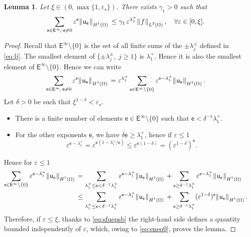 \documentclass[10pt,a4paper]{amsart}
\newtheorem{lemma}{Lemma}
\newcommand {\DNorm}[2]{ \mathchoice
    {\|\ee #1\ee\|\dd{#2}\,}
    {\| #1 \|_{#2}}
    {\| #1 \|_{#2}}
    {\| #1 \|_{#2}} }
\newcommand{\dd}[1]{_{\raise-0.6ex\hbox{$\scriptstyle #1$}}}
\newcommand{\ee}{\hskip0.15ex}
\newcommand{\sfE}{{\mathsf E}}
\newcommand{\sfe}{{\mathsf e}}
\newcommand{\sfu}{{\mathsf u}}
\begin{document}
\begin{lemma}
\label{lem:S1}
Let $\xi\in(0,\max\{1,\varepsilon_\star\})$. There exists $\gamma_1>0$ such that
\[
   \sum_{\sfe\in\sfE^\infty\!,\;\sfe\neq0} \varepsilon^{\sfe} \DNorm{\sfu_\sfe}{H^1(\Omega)}
   \le \gamma_1\, \varepsilon^{\lambda^+_1}
   {\DNorm{f}{L^2(\Omega)}},\quad\forall\varepsilon\in[0,\xi].
\]
\end{lemma}

\begin{proof}
Recall that $\sfE^\infty\setminus\{0\}$ is the set of all finite sums of the $\pm\lambda^\pm_j$ defined in \eqref{eq:lj}. The smallest element of $\{\pm\lambda^\pm_j,\;j\ge1\}$ is $\lambda^+_1$. Hence it is also the smallest element of $\sfE^\infty\setminus\{0\}$. Hence we can write
\begin{equation}
\label{eq:eneq0}
   \sum_{\sfe\in\sfE^\infty\!,\;\sfe\neq0} \varepsilon^{\sfe} \DNorm{\sfu_\sfe}{H^1(\Omega)} =
   \varepsilon^{\lambda^+_1} 
   \sum_{\sfe\in\sfE^\infty\setminus\{0\}} \varepsilon^{\sfe-\lambda^+_1} 
   \DNorm{\sfu_\sfe}{H^1(\Omega)}.
\end{equation}
Let $\delta>0$ be such that $\xi^{1-\delta}<\varepsilon_\star$. 
\begin{itemize}
\item There is a finite number of elements $\sfe\in\sfE^\infty\setminus\{0\}$ such that $\sfe<\delta^{-1}\lambda^+_1$.

\item For the other exponents $\sfe$, we have $\delta\sfe\ge \lambda^+_1$, hence if $\varepsilon\le1$
\[
   \varepsilon^{\sfe-\lambda^+_1} = 
   \varepsilon^{\sfe(1-\lambda^+_1/\sfe)} \le 
   \varepsilon^{\sfe(1-\delta)}=
   (\varepsilon^{1-\delta})^\sfe.
\]
\end{itemize}
Hence for $\varepsilon\le1$
\[
\begin{aligned}
   \sum_{\sfe\in\sfE^\infty\setminus\{0\}} \varepsilon^{\sfe-\lambda^+_1} 
   \DNorm{\sfu_\sfe}{H^1(\Omega)} &=
   \sum_{\lambda^+_1\le\sfe<\delta^{-1}\lambda^+_1}
   \varepsilon^{\sfe-\lambda^+_1} 
   \DNorm{\sfu_\sfe}{H^1(\Omega)} +
   \sum_{\sfe\ge\delta^{-1}\lambda^+_1}
   \varepsilon^{\sfe-\lambda^+_1} 
   \DNorm{\sfu_\sfe}{H^1(\Omega)} \\
&\le
   \sum_{\lambda^+_1\le\sfe<\delta^{-1}\lambda^+_1}
   \varepsilon^{\sfe-\lambda^+_1} 
   \DNorm{\sfu_\sfe}{H^1(\Omega)} +
   \sum_{\sfe\ge\delta^{-1}\lambda^+_1}
   (\varepsilon^{1-\delta})^\sfe 
   \DNorm{\sfu_\sfe}{H^1(\Omega)} .
\end{aligned}
\]
Therefore, if $\varepsilon\le\xi$, thanks to \eqref{eq:sfuepsb} the right-hand side defines a quantity bounded independently of $\varepsilon$, which, owing to \eqref{eq:eneq0}, proves the lemma.
\end{proof}
\end{document}
